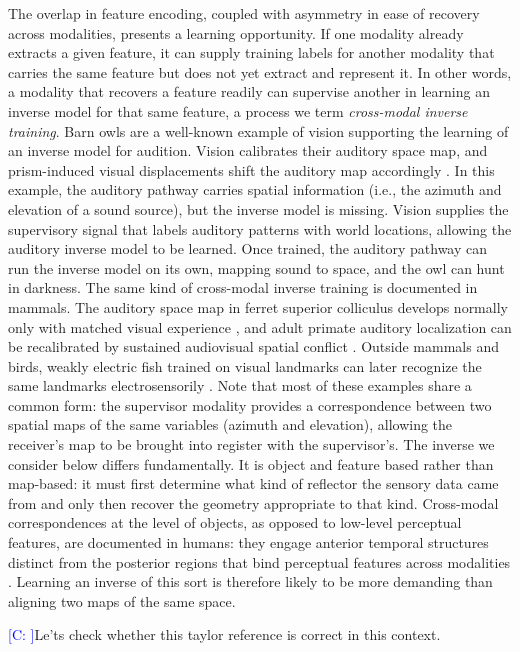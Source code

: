 \documentclass[11pt]{article}
\newcommand{\cnote}[2][]{\textcolor{blue}{[C#1: #2]}}
\begin{document}
The overlap in feature encoding, coupled with asymmetry in ease of recovery across modalities, presents a learning opportunity. If one modality already extracts a given feature, it can supply training labels for another modality that carries the same feature but does not yet extract and represent it. In other words, a modality that recovers a feature readily can supervise another in learning an inverse model for that same feature, a process we term \emph{cross-modal inverse training}. Barn owls are a well-known example of vision supporting the learning of an inverse model for audition. Vision calibrates their auditory space map, and prism-induced visual displacements shift the auditory map accordingly \citep{Knudsen1995}. In this example, the auditory pathway carries spatial information (i.e., the azimuth and elevation of a sound source), but the inverse model is missing. Vision supplies the supervisory signal that labels auditory patterns with world locations, allowing the auditory inverse model to be learned. Once trained, the auditory pathway can run the inverse model on its own, mapping sound to space, and the owl can hunt in darkness. The same kind of cross-modal inverse training is documented in mammals. The auditory space map in ferret superior colliculus develops normally only with matched visual experience \citep{King1995}, and adult primate auditory localization can be recalibrated by sustained audiovisual spatial conflict \citep{Recanzone1998}. Outside mammals and birds, weakly electric fish trained on visual landmarks can later recognize the same landmarks electrosensorily \citep{Schumacher2017}. Note that most of these examples share a common form: the supervisor modality provides a correspondence between two spatial maps of the same variables (azimuth and elevation), allowing the receiver's map to be brought into register with the supervisor's. The inverse we consider below differs fundamentally. It is object and feature based rather than map-based: it must first determine what kind of reflector the sensory data came from and only then recover the geometry appropriate to that kind. Cross-modal correspondences at the level of objects, as opposed to low-level perceptual features, are documented in humans: they engage anterior temporal structures distinct from the posterior regions that bind perceptual features across modalities \citep{Taylor2006}. Learning an inverse of this sort is therefore likely to be more demanding than aligning two maps of the same space.

\cnote{}{Le'ts check whether this taylor reference is correct in this context.}
\end{document}
